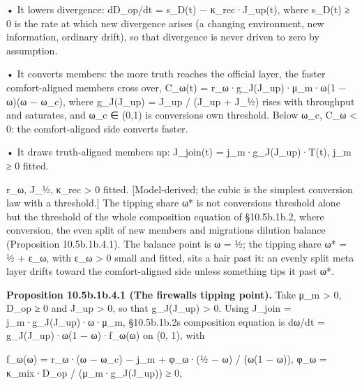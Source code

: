 \documentclass[
]{article}
\begin{document}
• It lowers divergence: dD\_op/dt = s\_D(t) − κ\_rec·J\_up(t), where
s\_D(t) ≥ 0 is the rate at which new divergence arises (a changing
environment, new information, ordinary drift), so that divergence is
never driven to zero by assumption.

• It converts members: the more truth reaches the official layer, the
faster comfort-aligned members cross over, C\_ω(t) =
r\_ω·g\_J(J\_up)·μ\_m·ω(1 − ω)(ω − ω\_c), where g\_J(J\_up) = J\_up /
(J\_up + J\_½) rises with throughput and saturates, and ω\_c ∈ (0,1) is
conversion\textquotesingle s own threshold. Below ω\_c, C\_ω \textless{}
0: the comfort-aligned side converts faster.

• It draws truth-aligned members up: J\_join(t) = j\_m·g\_J(J\_up)·T(t),
j\_m ≥ 0 fitted.

r\_ω, J\_½, κ\_rec \textgreater{} 0 fitted. {[}Model-derived; the cubic
is the simplest conversion law with a threshold.{]} The tipping share ω*
is not conversion\textquotesingle s threshold alone but the threshold of
the whole composition equation of §10.5b.1b.2, where conversion, the
even split of new members and migration\textquotesingle s dilution
balance (Proposition 10.5b.1b.4.1). The balance point is ω = ½; the
tipping share ω* = ½ + ε\_ω, with ε\_ω \textgreater{} 0 small and
fitted, sits a hair past it: an evenly split meta layer drifts toward
the comfort-aligned side unless something tips it past ω*.

\textbf{Proposition 10.5b.1b.4.1 (The firewall\textquotesingle s tipping
point).} Take μ\_m \textgreater{} 0, D\_op ≥ 0 and J\_up \textgreater{}
0, so that g\_J(J\_up) \textgreater{} 0. Using J\_join =
j\_m·g\_J(J\_up)·ω·μ\_m, §10.5b.1b.2\textquotesingle s composition
equation is dω/dt = g\_J(J\_up)·ω(1 − ω)·f\_ω(ω) on (0, 1), with

f\_ω(ω) = r\_ω·(ω − ω\_c) − j\_m + φ\_ω·(½ − ω) / (ω(1 − ω)), φ\_ω =
κ\_mix·D\_op / (μ\_m·g\_J(J\_up)) ≥ 0,
\end{document}
